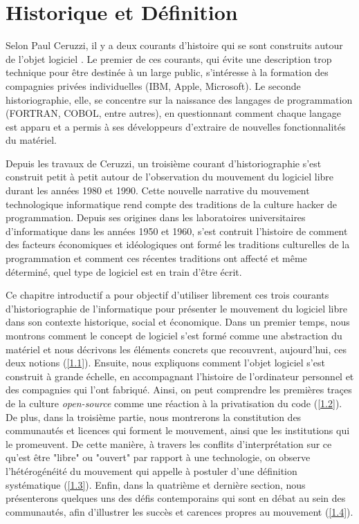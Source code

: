 \chapter{Historique et Définition} \label{1}

Selon Paul Ceruzzi, il y a deux courants d'histoire qui se sont construits autour de l'objet logiciel \citep{Ceruzzi1998}. Le premier de ces courants, qui évite une description trop technique pour être destinée à un large public, s'intéresse à la formation des compagnies privées individuelles (IBM, Apple, Microsoft). Le seconde historiographie, elle, se concentre sur la naissance des langages de programmation (FORTRAN, COBOL, entre autres), en questionnant comment chaque langage est apparu et a permis à ses développeurs d'extraire de nouvelles fonctionnalités du matériel.

Depuis les travaux de Ceruzzi, un troisième courant d'historiographie s'est construit petit à petit autour de l'observation du mouvement du logiciel libre durant les années 1980 et 1990. Cette nouvelle narrative du mouvement technologique informatique rend compte des traditions de la culture hacker de programmation. Depuis ses origines dans les laboratoires universitaires d'informatique dans les années 1950 et 1960, s'est contruit l'histoire de comment des facteurs économiques et idéologiques ont formé les traditions culturelles de la programmation et comment ces récentes traditions ont affecté et même déterminé, quel type de logiciel est en train d'être écrit.

Ce chapitre introductif a pour objectif d'utiliser librement ces trois courants d'historiographie de l'informatique pour présenter le mouvement du logiciel libre dans son contexte historique, social et économique. Dans un premier temps, nous montrons comment le concept de logiciel s'est formé comme une abstraction du matériel et nous décrivons les éléments concrets que recouvrent, aujourd'hui, ces deux notions (\ref{1.1}). Ensuite, nous expliquons comment l'objet logiciel s'est construit à grande échelle, en accompagnant l'histoire de l'ordinateur personnel et des compagnies qui l'ont fabriqué. Ainsi, on peut comprendre les premières traçes de la culture \emph{open-source} comme une réaction à la privatisation du code (\ref{1.2}). De plus, dans la troisième partie, nous montrerons la constitution des communautés et licences qui forment le mouvement, ainsi que les institutions qui le promeuvent. De cette manière, à travers les conflits d'interprétation sur ce qu'est être "libre" ou "ouvert" par rapport à une technologie, on observe l'hétérogénéité du mouvement qui appelle  à postuler d'une définition systématique (\ref{1.3}). Enfin, dans la quatrième et dernière section, nous présenterons quelques uns des défis contemporains qui sont en débat au sein des communautés, afin d'illustrer les succès et carences propres au mouvement (\ref{1.4}).

